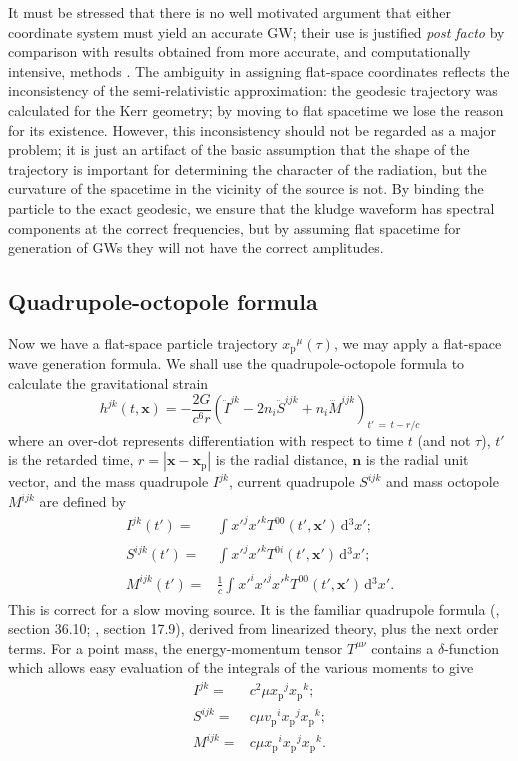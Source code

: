 \documentclass[useAMS,usedcolumn,usegraphicx,usenatbib]{mn2e}
\newcommand{\sub}[1]{\ensuremath{_\mathrm{#1}}}
\newcommand{\dd}{\ensuremath{\mathrm{d}}}
\newcommand{\intd}[4]{\ensuremath{\int_{#1}^{#2}{#3}\,\dd{#4}}}
\newcommand{\recip}[1]{\ensuremath{\frac{1}{#1}}}
\begin{document}
It must be stressed that there is no well motivated argument that either coordinate system must yield an accurate GW; their use is justified {\it post facto} by comparison with results obtained from more accurate, and computationally intensive, methods \citep{Gair2005, Babak2007}. The ambiguity in assigning flat-space coordinates reflects the inconsistency of the semi-relativistic approximation: the geodesic trajectory was calculated for the Kerr geometry; by moving to flat spacetime we lose the reason for its existence. However, this inconsistency should not be regarded as a major problem; it is just an artifact of the basic assumption that the shape of the trajectory is important for determining the character of the radiation, but the curvature of the spacetime in the vicinity of the source is not. By binding the particle to the exact geodesic, we ensure that the kludge waveform has spectral components at the correct frequencies, but by assuming flat spacetime for generation of GWs they will not have the correct amplitudes.

\subsection{Quadrupole-octopole formula}

Now we have a flat-space particle trajectory $x\sub{p}^\mu(\tau)$, we may apply a flat-space wave generation formula. We shall use the quadrupole-octopole formula to calculate the gravitational strain \citep{Bekenstein1973, Press1977}
\begin{equation}
h^{jk}(t, \boldsymbol{x}) = -\frac{2G}{c^6r}\left(\ddot{I}^{jk} - 2n_i\ddot{S}^{ijk} + n_i\dddot{M}^{ijk}\right)_{t'\, =\, t - r/c}
\label{eq:Octopole}
\end{equation}
where an over-dot represents differentiation with respect to time $t$ (and not $\tau$), $t'$ is the retarded time, $r = \left|\boldsymbol{x} - \boldsymbol{x}\sub{p}\right|$ is the radial distance, $\boldsymbol{n}$ is the radial unit vector, and the mass quadrupole ${I}^{jk}$, current quadrupole ${S}^{ijk}$ and mass octopole ${M}^{ijk}$ are defined by
\begin{align}
{I}^{jk}(t') = {} & \intd{}{}{{x'}^j{x'}^kT^{00}(t', \boldsymbol{x'})}{^3x'};\\
{S}^{ijk}(t') = {} & \intd{}{}{{x'}^j{x'}^kT^{0i}(t', \boldsymbol{x'})}{^3x'};\\
{M}^{ijk}(t') = {} & \recip{c}\intd{}{}{{x'}^i{x'}^j{x'}^kT^{00}(t', \boldsymbol{x'})}{^3x'}.
\end{align}
This is correct for a slow moving source. It is the familiar quadrupole formula (\citealt{Misner1973}, section 36.10; \citealt{Hobson2006}, section 17.9), derived from linearized theory, plus the next order terms. For a point mass, the energy-momentum tensor $T^{\mu\nu}$ contains a $\delta$-function which allows easy evaluation of the integrals of the various moments to give
\begin{align}
{I}^{jk} = {} & c^2\mu x\sub{p}^jx\sub{p}^k;\\
{S}^{ijk} = {} & c\mu v\sub{p}^ix\sub{p}^jx\sub{p}^k;\\
{M}^{ijk} = {} & c\mu x\sub{p}^ix\sub{p}^jx\sub{p}^k.
\end{align}
\end{document}
